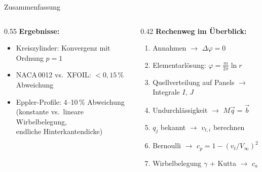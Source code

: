 \documentclass[aspectratio=169]{beamer}
\begin{document}
\begin{frame}{Zusammenfassung}
\footnotesize

\begin{columns}[T]
\begin{column}{0.55\textwidth}
\textbf{Ergebnisse:}
\begin{itemize}\setlength\itemsep{3pt}
  \item Kreiszylinder: Konvergenz mit Ordnung $p\!=\!1$
  \item NACA\,0012 vs.\ XFOIL: $< 0{,}15\,\%$ Abweichung
  \item Eppler-Profile: 4--10\,\% Abweichung\\
        (konstante vs.\ lineare Wirbelbelegung,\\
        endliche Hinterkantendicke)
\end{itemize}
\end{column}
\begin{column}{0.42\textwidth}
\textbf{Rechenweg im Überblick:}

\medskip
\begin{enumerate}\setlength\itemsep{3pt}
  \item Annahmen $\to$ $\Delta\varphi = 0$
  \item Elementarlösung: $\varphi = \frac{m}{2\pi}\ln r$
  \item Quellverteilung auf Panels $\to$ Integrale $I,\,J$
  \item Undurchlässigkeit $\to$ $M\vec{q}=\vec{b}$
  \item $q_j$ bekannt $\to$ $v_{t,i}$ berechnen
  \item Bernoulli $\to$ $c_p = 1-(v_t/V_\infty)^2$
  \item Wirbelbelegung $\gamma$ + Kutta $\to$ $c_a$
\end{enumerate}
\end{column}
\end{columns}

\end{frame}
\end{document}
